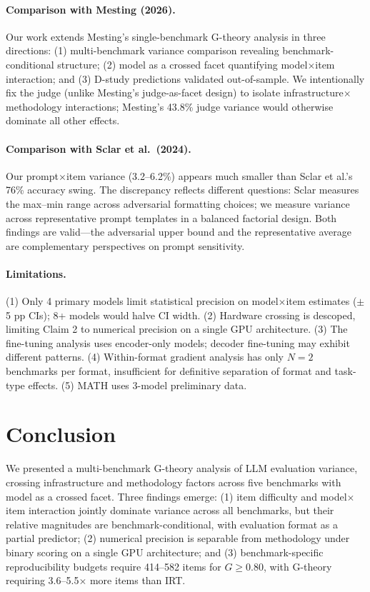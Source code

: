 \documentclass[11pt]{article}
\begin{document}
\paragraph{Comparison with Mesting (2026).}
Our work extends Mesting's single-benchmark G-theory analysis in three directions: (1) multi-benchmark variance comparison revealing benchmark-conditional structure; (2) model as a crossed facet quantifying model$\times$item interaction; and (3) D-study predictions validated out-of-sample.
We intentionally fix the judge (unlike Mesting's judge-as-facet design) to isolate infrastructure$\times$methodology interactions; Mesting's 43.8\% judge variance would otherwise dominate all other effects.

\paragraph{Comparison with Sclar et al.\ (2024).}
Our prompt$\times$item variance (3.2--6.2\%) appears much smaller than Sclar et al.'s 76\% accuracy swing.
The discrepancy reflects different questions: Sclar measures the max--min range across adversarial formatting choices; we measure variance across representative prompt templates in a balanced factorial design.
Both findings are valid---the adversarial upper bound and the representative average are complementary perspectives on prompt sensitivity.

\paragraph{Limitations.}
(1) Only 4 primary models limit statistical precision on model$\times$item estimates ($\pm$5 pp CIs); 8+ models would halve CI width.
(2) Hardware crossing is descoped, limiting Claim 2 to numerical precision on a single GPU architecture.
(3) The fine-tuning analysis uses encoder-only models; decoder fine-tuning may exhibit different patterns.
(4) Within-format gradient analysis has only $N = 2$ benchmarks per format, insufficient for definitive separation of format and task-type effects.
(5) MATH uses 3-model preliminary data.

\section{Conclusion}
\label{sec:conclusion}

We presented a multi-benchmark G-theory analysis of LLM evaluation variance, crossing infrastructure and methodology factors across five benchmarks with model as a crossed facet.
Three findings emerge: (1) item difficulty and model$\times$item interaction jointly dominate variance across all benchmarks, but their relative magnitudes are benchmark-conditional, with evaluation format as a partial predictor; (2) numerical precision is separable from methodology under binary scoring on a single GPU architecture; and (3) benchmark-specific reproducibility budgets require 414--582 items for $G \geq 0.80$, with G-theory requiring 3.6--5.5$\times$ more items than IRT.
\end{document}

